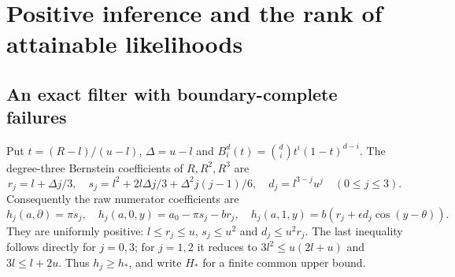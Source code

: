 \section{Positive inference and the rank of attainable likelihoods}\label{sec:rank}
\subsection{An exact filter with boundary-complete failures}
Put $t=(R-l)/(u-l)$, $\Delta=u-l$ and $B_i^d(t)=\binom di t^i(1-t)^{d-i}$. The degree-three Bernstein coefficients of $R,R^2,R^3$ are
\[
 r_j=l+\Delta j/3,\quad s_j=l^2+2l\Delta j/3+\Delta^2j(j-1)/6,
 \quad d_j=l^{3-j}u^j\quad(0\le j\le3).
\]
Consequently the raw numerator coefficients are
\[
 h_j(a,\partial)=\pi s_j,\quad h_j(a,0,y)=a_0-\pi s_j-br_j,
 \quad h_j(a,1,y)=b(r_j+\epsilon d_j\cos(y-\theta)).
\]
They are uniformly positive: $l\le r_j\le u$, $s_j\le u^2$ and $d_j\le u^2r_j$. The last inequality follows directly for $j=0,3$; for $j=1,2$ it reduces to $3l^2\le u(2l+u)$ and $3l\le l+2u$. Thus $h_j\ge h_*$, and write $H_*$ for a finite common upper bound.

